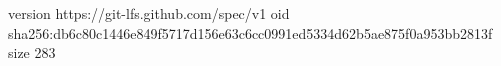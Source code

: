 version https://git-lfs.github.com/spec/v1
oid sha256:db6c80c1446e849f5717d156e63c6cc0991ed5334d62b5ae875f0a953bb2813f
size 283
